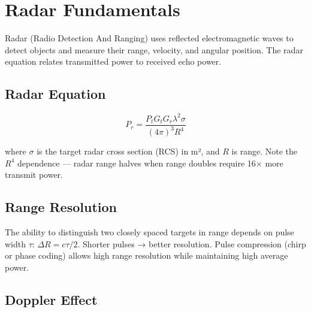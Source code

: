 \section{Radar Fundamentals}\label{sec:wiki_radar}



Radar (Radio Detection And Ranging) uses reflected electromagnetic waves to detect objects and measure their range, velocity, and angular position. The radar equation relates transmitted power to received echo power.

				

\subsection{Radar Equation}

				


				
\[P_r = \dfrac{P_t G_t G_r \lambda^2 \sigma}{(4\pi)^3 R^4}\]

				

where $\sigma$ is the target radar cross section (RCS) in m², and $R$ is range. Note the $R^4$ dependence — radar range halves when range doubles require 16× more transmit power.


				

\subsection{Range Resolution}

				

The ability to distinguish two closely spaced targets in range depends on pulse width $\tau$: $\Delta R = c\tau/2$. Shorter pulses → better resolution. Pulse compression (chirp or phase coding) allows high range resolution while maintaining high average power.

				

\subsection{Doppler Effect}

				

